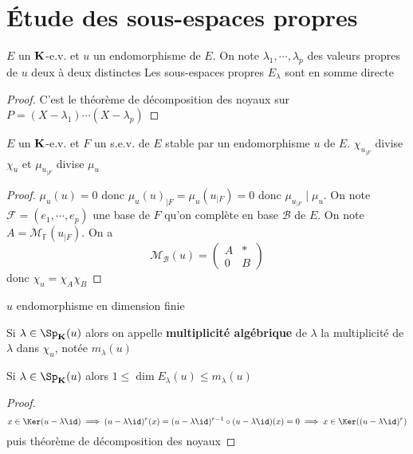 \section{Étude des sous-espaces propres}

\begin{prop}
    \Hyp $E$ un $\mathbf K$-e.v. et $u$ un endomorphisme de $E$. On note $\lambda_1, \cdots, \lambda_p$ des valeurs propres de $u$ deux à deux distinctes
    \Conc Les sous-espaces propres $E_\lambda$ sont en somme directe
\end{prop}

\begin{proof}
    C'est le théorème de décomposition des noyaux sur $P=(X-\lambda_1)\cdots (X-\lambda_p)$
\end{proof}

\begin{prop}
    \Hyp $E$ un $\mathbf K$-e.v. et $F$ un s.e.v. de $E$ stable par un endomorphisme $u$ de $E$.
    \Conc $\chi_{u_{|F}}$ divise $\chi_u$ et $\mu_{u_{|F}}$ divise $\mu_u$
\end{prop}

\begin{proof}
    $\mu_u(u)=0$ donc $\mu_u(u)_{|F} =\mu_u(u_{|F})=0$ donc $\mu_{u_{|F}} \;|\;\mu_u$. On note $\mathcal F=(e_1, \cdots , e_p)$ une base de $F$ qu'on complète en base $\mathcal B$ de $E$. On note $A=\mathcal M_{\mathbb F}(u_{|F})$. On a \[
        \mathcal M_{\mathcal B}(u)= \left( \begin{array}{c|c}
                 A & * \\ 
                \hline 0 & B
        \end{array} \right)
    \]
    donc $\chi_{u}=\chi_A\chi_B$
\end{proof}

\begin{thmdef}
    \Hyp $u$ endomorphisme en dimension finie
    \begin{concenum}
    \item Si $\lambda\in\Sp_{\K}(u)$ alors on appelle \textbf{multiplicité algébrique} de $\lambda$ la multiplicité de $\lambda$ dans $\chi_u$, notée $m_\lambda(u)$
    \item Si $\lambda\in\Sp_{\K}(u)$ alors $1\leq \dim E_{\lambda}(u)\leq m_\lambda(u)$
    \end{concenum}
\end{thmdef}

\begin{proof}
    \[x\in \Ker (u-\lambda\id)\implies  (u-\lambda\id)^r(x)=(u-\lambda\id)^{r-1}\circ (u-\lambda\id)(x)=0\implies x\in \Ker((u-\lambda\id)^r)\] puis théorème de décomposition des noyaux
\end{proof}

